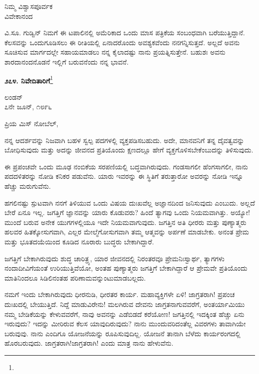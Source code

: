 \begin{flushright}
ನಿಮ್ಮ ವಿಶ್ವಾಸಪೂರ್ವಕ\\ವಿವೇಕಾನಂದ
\end{flushright}

ವಿ.ಸೂ.\enginline{-} ಗುಡ್ವಿನ್ ನಿಮಗೆ ಈ ಟಪಾಲಿನಲ್ಲಿ ಅಮೆರಿಕಾದ ಒಂದು ಮಾಸ ಪತ್ರಿಕೆಯ ಸಂಬಂಧವಾಗಿ ಬರೆಯುತ್ತಿದ್ದಾನೆ. ಕೆಲಸವನ್ನು ಒಂದುಗೂಡಿಸಲು ಈ ರೀತಿಯಲ್ಲಿ ಏನಾದರೊಂದು ಅವಶ್ಯಕವೆಂದು ನನಗನ್ನಿಸುತ್ತದೆ. ಅಲ್ಲದೆ ಅವನು ಸೂಚಿಸುವ ಮಾರ್ಗದಲ್ಲೇ ಸಹಾಯಮಾಡಲು ನನ್ನ ಕೈಲಾದಷ್ಟು ನಾನು ಪ್ರಯತ್ನಿಸುತ್ತೇನೆ. ಬಹುಶಃ ಅವನು ಶಾರದಾ\break ನಂದನೊಡನೆ ಇಲ್ಲಿಗೆ ಬರುವನೆಂದು ನನ್ನ ಭಾವನೆ.

\begin{center}
\textbf{೨೭೪. ನಿವೇದಿತಾರಿಗೆ}\footnote{}
\end{center}

\begin{flushright}
ಲಂಡನ್\\೭ನೇ ಜೂನ್, ೧೮೯೬
\end{flushright}

\noindent
ಪ್ರಿಯ ಮಿಸ್ ನೋಬೆಲ್,

ನನ್ನ ಆದರ್ಶವನ್ನು ನಿಜವಾಗಿ ಬಹಳ ಸ್ವಲ್ಪ ಪದಗಳಲ್ಲಿ ವ್ಯಕ್ತಪಡಿಸಬಹುದು. ಅದೇ, ಮಾನವನಿಗೆ ತನ್ನ ದೈವತ್ವವನ್ನು ಬೋಧಿಸುವುದು ಮತ್ತು ಅದನ್ನು ಜೀವನದ ಪ್ರತಿಯೊಂದು ಕ್ಷಣದಲ್ಲೂ ಹೇಗೆ ವ್ಯಕ್ತಗೊಳಿಸಬೇಕೆಂಬುದನ್ನು ತಿಳಿಸುವುದು.
\vspace{0.3cm}

ಈ ಪ್ರಪಂಚವೇ ಒಂದು ಮೂಢ ನಂಬಿಕೆಯ ಸರಪಣಿಯಲ್ಲಿ ಬದ್ಧವಾಗಿರುವುದು. ಗಂಡಸಾಗಲೀ ಹೆಂಗಸಾಗಲೀ, ನಾನು ಪದದಳಿತರನ್ನು ನೋಡಿ ಕನಿಕರ ಪಡುವೆನು. ಯಾರು ಇವರನ್ನು ಈ ಸ್ಥಿತಿಗೆ ತರುತ್ತಾರೋ ಅವರನ್ನು ನೋಡಿ ಇನ್ನೂ ಹೆಚ್ಚು ಮರುಗುವೆನು.
\vspace{0.3cm}

ಹಗಲಿನಷ್ಟು ಸ್ಪುಟವಾಗಿ ನನಗೆ ತಿಳಿಯುವ ಒಂದು ವಿಷಯ ದುಃಖವೆಲ್ಲ ಅಜ್ಞಾನದಿಂದ ಜನಿಸುವುದು ಎಂಬುದು. ಅಲ್ಲದೆ ಬೇರೆ ಏನೂ ಇಲ್ಲ. ಜಗತ್ತಿಗೆ ಜ್ಞಾನವನ್ನು ಯಾರು ಕೊಡುವರು? ಹಿಂದೆ ತ್ಯಾಗವು ಒಂದು ನಿಯಮವಾಗಿತ್ತು. ಅಯ್ಯೋ! ಮುಂದೆ ಬರುವ ಅನೇಕ ಯುಗಗಳಲ್ಲಿಯೂ ಇದೇ ನಿಯಮವಾಗುವುದು. ಜಗತ್ತಿನ ಅತಿ ಧೀರರು ಮತ್ತು ಪುಣ್ಯಾತ್ಮರು ಹಲವರ ಹಿತಕ್ಕೋಸುಗವಾಗಿ, ಎಲ್ಲರ ಮೇಲ್ಮೆಗೋಸುಗವಾಗಿ ತಮ್ಮ ಆತ್ಮವನ್ನು ಅರ್ಪಣೆ ಮಾಡಬೇಕು. ಅನಂತ ಪ್ರೇಮ ಮತ್ತು ಭೂತದಯೆಯಿಂದ ಕೂಡಿದ ನೂರಾರು ಬುದ್ಧರು ಬೇಕಾಗಿದ್ದಾರೆ.
\vspace{0.3cm}

ಜಗತ್ತಿಗೆ ಬೇಕಾಗಿರುವುದು ಶುದ್ಧ ಚಾರಿತ್ರ್ಯ, ಯಾರ ಜೀವನದಲ್ಲಿ ನಿರಂತರವೂ ಪ್ರೇಮನಿಃಸ್ವಾರ್ಥ, ತ್ಯಾಗಗಳು ನಂದಾದೀವಿಗೆಯಂತೆ ಉರಿಯುತ್ತಿವೆಯೋ, ಅಂತಹ ಪುಣ್ಯಾತ್ಮರು ಜಗತ್ತಿಗೆ ಬೇಕಾಗಿದ್ದಾರೆ ಆ ಪ್ರೇಮವೇ ಪ್ರತಿಯೊಂದು ಮಾತಿನಿಂದಲೂ ಸಿಡಿಲಿನಂತಹ ಪರಿಣಾಮವನ್ನುಂಟುಮಾಡಬಲ್ಲದು.

ನಮಗೆ ಇಂದು ಬೇಕಾಗಿರುವುದು ಧೀರನುಡಿ, ಧೀರತರ ಕಾರ್ಯ. ಮಹಾವ್ಯಕ್ತಿಗಳೇ ಏಳಿ! ಜಾಗ್ರತರಾಗಿ! ಪ್ರಪಂಚ ದುಃಖದಲ್ಲಿ ಬೇಯುತ್ತಿದೆ. ನಿದ್ದೆ ಮಾಡುವಿರೇನು! ಮಲಗಿರುವ ದೇವನು ಜಾಗ್ರತನಾಗುವವರೆಗೆ, ಅಂತರ್ಯಾಮಿಯು ನಮ್ಮ ಬೇಡಿಕೆಯನ್ನು ಕೇಳುವವರೆಗೆ, ನಾವು ಅವನನ್ನು ಎಡೆಬಿಡದೆ ಕರೆಯೋಣ! ಜಗತ್ತಿನಲ್ಲಿ ಇದಕ್ಕಿಂತ ಹೆಚ್ಚು ಏನು ಇರುವುದು? ಇದನ್ನು ಮೀರಿರುವ ಕೆಲಸ ಯಾವುದಿರುವುದು? ನಾನು ಮುಂದುವರಿದಂತೆಲ್ಲ ವಿವರಗಳು ತಾವಾಗಿಯೇ ಬರುವುವು. ನಾನು ಎಂದಿಗೂ ಯೋಜನೆಯನ್ನು ರೂಪಿಸುವುದಿಲ್ಲ. ಯೋಜನೆ ತಾನಾಗಿ ಬೆಳೆದು ಕಾರ್ಯರಂಗದಲ್ಲಿ ಹೊರಬರುವುದು. ಜಾಗ್ರತರಾಗಿ!ಜಾಗ್ರತರಾಗಿ! ಎಂದು ಮಾತ್ರ ನಾನು ಹೇಳುವೆನು.

